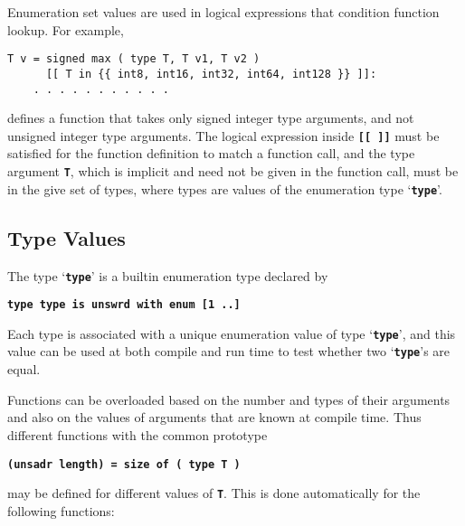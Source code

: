 \documentclass[12pt]{article}
\newcommand{\TT}[1]{{\tt \bfseries #1}}
\newenvironment{indpar}[1][0.3in]%
	{\begin{list}{}%
		     {\setlength{\itemsep}{0in}%
		      \setlength{\topsep}{0in}%
		      \setlength{\parsep}{1ex}%
		      \setlength{\labelwidth}{#1}%
		      \setlength{\leftmargin}{#1}%
		      \addtolength{\leftmargin}{\labelsep}}%
	 \item}%
	{\end{list}}
\begin{document}
Enumeration set values are used in logical expressions that
condition function lookup.  For example,
\begin{indpar}\begin{verbatim}
T v = signed max ( type T, T v1, T v2 )
      [[ T in {{ int8, int16, int32, int64, int128 }} ]]:
    . . . . . . . . . . .
\end{verbatim}\end{indpar}

defines a function that takes only signed integer type
arguments, and not unsigned integer type arguments.
The logical expression inside \TT{[[~]]} must be satisfied
for the function definition to match a function call, and
the type argument \TT{T}, which is implicit and need not be
given in the function call, must be in the give set of
types, where types are values of the enumeration type `\TT{type}'.

\subsection{Type Values}
\label{TYPE-VALUES}

The type `\TT{type}' is a builtin enumeration type declared
by
\begin{center}
\TT{type type is unswrd with enum [1 ..]}
\end{center}
Each type is associated with a unique enumeration value
of type `\TT{type}', and this value can be used at both
compile and run time to test whether two `\TT{type}'s are
equal.

Functions can be overloaded based on the number and types
of their arguments and also on the values of arguments that
are known at compile time.  Thus different functions with
the common prototype
\begin{center}
\TT{(unsadr length) = size of ( type T )}
\end{center}
may be defined for different values of \TT{T}.  
This is done automatically for the following functions:
\end{document}
